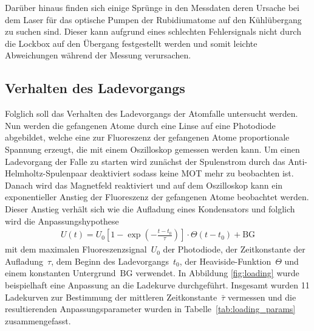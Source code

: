 \documentclass[11pt, a4paper]{article}
\numberwithin{equation}{section}
\begin{document}
Darüber hinaus finden sich einige Sprünge in den Messdaten deren Ursache bei dem Laser für das optische Pumpen der Rubidiumatome auf den Kühlübergang zu suchen sind.
Dieser kann aufgrund eines schlechten Fehlersignals nicht durch die Lockbox auf den Übergang festgestellt werden und somit leichte Abweichungen während der Messung verursachen.


\subsection{Verhalten des Ladevorgangs}
Folglich soll das Verhalten des Ladevorgangs der Atomfalle untersucht werden.
Nun werden die gefangenen Atome durch eine Linse auf eine Photodiode abgebildet, welche eine zur Fluoreszenz der gefangenen Atome proportionale Spannung erzeugt, die mit einem Oszilloskop gemessen werden kann.
Um einen Ladevorgang der Falle zu starten wird zunächst der Spulenstrom durch das Anti-Helmholtz-Spulenpaar deaktiviert sodass keine MOT mehr zu beobachten ist.
Danach wird das Magnetfeld reaktiviert und auf dem Oszilloskop kann ein exponentieller Anstieg der Fluoreszenz der gefangenen Atome beobachtet werden.
Dieser Anstieg verhält sich wie die Aufladung eines Kondensators und folglich wird die Anpassungshypothese
\begin{align}
	U(t) =  U_0 \left[ 1 - \exp\left( - \frac{t - t_0}{\tau} \right) \right] \cdot \Theta(t - t_0) + \mathrm{BG}
	\label{eq:loading_fit}
\end{align}
mit dem maximalen Fluoreszenzsignal~$U_0$ der Photodiode, der Zeitkonstante der Aufladung~$\tau$, dem Beginn des Ladevorgangs~$t_0$, der Heaviside-Funktion~$\Theta$ und einem konstanten Untergrund~$\mathrm{BG}$ verwendet.
In Abbildung \ref{fig:loading} wurde beispielhaft eine Anpassung an die Ladekurve durchgeführt.
Insgesamt wurden 11 Ladekurven zur Bestimmung der mittleren Zeitkonstante~$\bar{\tau}$ vermessen und die resultierenden Anpassungsparameter wurden in Tabelle~\ref{tab:loading_params} zusammengefasst.
\end{document}
